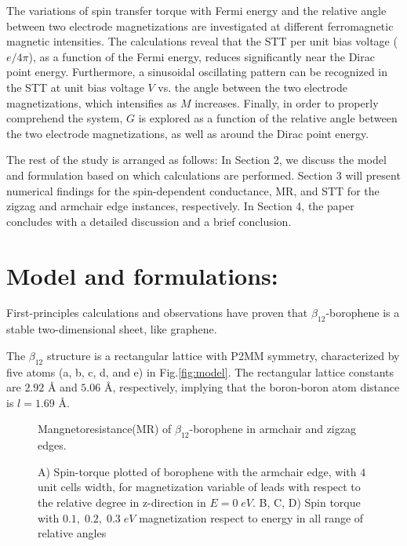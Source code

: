 \documentclass[twoside,twocolumn,9pt]{article}
\begin{document}
The variations of spin transfer torque with Fermi energy and the relative angle between two electrode magnetizations are investigated at different ferromagnetic magnetic intensities. The calculations reveal that the STT per unit bias voltage ($e/4\pi$), as a function of the Fermi energy, reduces significantly near the Dirac point energy. Furthermore, a sinusoidal oscillating pattern can be recognized in the STT at unit bias voltage $V$ vs. the angle between the two electrode magnetizations, which intensifies as $M$ increases. Finally, in order to properly comprehend the system, $G$ is explored as a function of the relative angle between the two electrode magnetizations, as well as around the Dirac point energy.

The rest of the study is arranged as follows: In Section 2, we discuss the model and formulation based on which calculations are performed. Section 3 will present numerical findings for the spin-dependent conductance, MR, and STT for the zigzag and armchair edge instances, respectively. In Section 4, the paper concludes with a detailed discussion and a brief conclusion.

\section{Model and formulations:}
First-principles calculations and observations have proven that $\beta_{12}$-borophene is a stable two-dimensional sheet, like graphene\cite{feng2017dirac}. 

The $\beta_{12}$ structure is a rectangular lattice with P2MM symmetry, characterized by five atoms (a, b, c, d, and e) in Fig.\ref{fig:model}. The rectangular lattice constants are $2.92$ \AA\; and $5.06$ \AA\;\cite{zhang2016borophene}, respectively, implying that the boron-boron atom distance is $l = 1.69$ \AA.

\begin{figure*}
    \centering
    \resizebox{0.45\textwidth}{!}{}
    \resizebox{0.45\textwidth}{!}{}
     \caption{Mangnetoresistance(MR) of $\beta_{12}$-borophene in armchair and zigzag edges.}
    \label{fig:MR}
\end{figure*}

\begin{figure*}[ht]
    \centering
    \resizebox{0.45\textwidth}{!}{}
    \resizebox{0.45\textwidth}{!}{}
    \resizebox{0.45\textwidth}{!}{}
    \resizebox{0.45\textwidth}{!}{}
    \caption{ A) Spin-torque plotted of borophene with the armchair edge, with $4$ unit cells width, for magnetization variable of leads with respect to the relative degree in z-direction in $E = 0\; eV$. B, C, D) Spin torque with $0.1,\;0.2,\;0.3\;eV$ magnetization respect to energy in all range of relative angles}
    \label{fig:stt}
\end{figure*}
\end{document}
